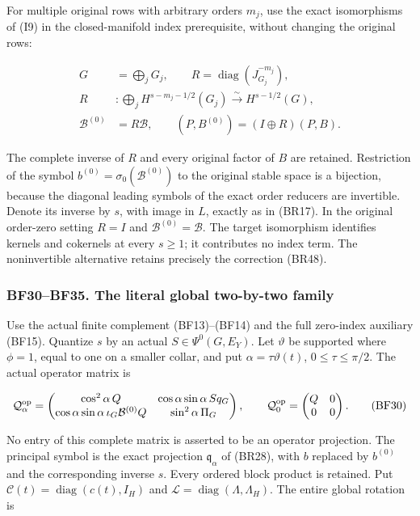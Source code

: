 \documentclass[
  11pt,
]{article}
\begin{document}
For multiple original rows with arbitrary orders \(m_j\), use the exact
isomorphisms of (I9) in the closed-manifold index prerequisite, without
changing the original rows:

\[
 \begin{split}
 G&=\bigoplus_jG_j,\qquad
 R=\operatorname{diag}(J_{G_j}^{-m_j}),\\
 R &: \bigoplus_j H^{s-m_j-1/2}(G_j)
             \xrightarrow{\sim} H^{s-1/2}(G),\\
 \mathcal B^{(0)}&=R\mathcal B,\qquad
 (P,B^{(0)})=(I\oplus R)(P,B).
 \end{split}
 \tag{BF29}
\]

The complete inverse of \(R\) and every original factor of \(B\) are
retained. Restriction of the symbol
\(b^{(0)}=\sigma_0(\mathcal B^{(0)})\) to the original stable space is a
bijection, because the diagonal leading symbols of the exact order
reducers are invertible. Denote its inverse by \(s\), with image in
\(L\), exactly as in (BR17). In the original order-zero setting \(R=I\)
and \(\mathcal B^{(0)}=\mathcal B\). The target isomorphism identifies
kernels and cokernels at every \(s\ge1\); it contributes no index term.
The noninvertible alternative retains precisely the correction (BR48).

\subsubsection{BF30--BF35. The literal global two-by-two
family}\label{bf30bf35.-the-literal-global-two-by-two-family}

Use the actual finite complement (BF13)--(BF14) and the full zero-index
auxiliary (BF15). Quantize \(s\) by an actual \(S\in\Psi^0(G,E_Y)\). Let
\(\vartheta\) be supported where \(\phi=1\), equal to one on a smaller
collar, and put \(\alpha=\tau\vartheta(t)\), \(0\le\tau\le\pi/2\). The
actual operator matrix is

\[
 \mathcal Q_\alpha^{\rm op}=
 \begin{pmatrix}
  \cos^2\alpha\,Q&\cos\alpha\sin\alpha\,S q_G\\
  \cos\alpha\sin\alpha\,\iota_G\mathcal B^{(0)}Q
                    &\sin^2\alpha\,\Pi_G
 \end{pmatrix},\qquad
 \mathcal Q_0^{\rm op}=\begin{pmatrix}Q&0\\0&0\end{pmatrix}.
 \tag{BF30}
\]

No entry of this complete matrix is asserted to be an operator
projection. The principal symbol is the exact projection
\(\mathfrak q_\alpha\) of (BR28), with \(b\) replaced by \(b^{(0)}\) and
the corresponding inverse \(s\). Every ordered block product is
retained. Put \(\mathcal C(t)=\operatorname{diag}(c(t),I_H)\) and
\(\mathcal L=\operatorname{diag}(\Lambda,\Lambda_H)\). The entire global
rotation is
\end{document}
